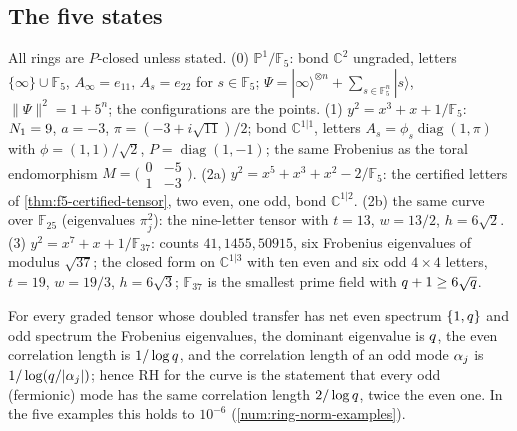 \subsection{The five states}

\begin{definition}
\label{def:example-states}
All rings are $P$-closed unless stated. (0) $\mathbb P^1/\mathbb F_5$: bond $\mathbb C^2$
ungraded, letters $\{\infty\}\cup\mathbb F_5$, $A_\infty = e_{11}$, $A_s = e_{22}$ for $s\in\mathbb F_5$;
$\Psi = |\infty\rangle^{\otimes n}+\sum_{s\in\mathbb F_5^n}|s\rangle$, $\|\Psi\|^2 = 1+5^n$; the
configurations are the points. (1) $y^2 = x^3+x+1/\mathbb F_5$: $N_{1} = 9$, $a = -3$,
$\pi = (-3+i\sqrt{11})/2$; bond $\mathbb C^{1|1}$, letters $A_s = \phi_s\operatorname{diag}(1,\pi)$ with
$\phi = (1,1)/\sqrt2$, $P = \operatorname{diag}(1,-1)$; the same Frobenius as the toral endomorphism
$M = \bigl(\begin{smallmatrix}0&-5\\1&-3\end{smallmatrix}\bigr)$. (2a) $y^2 = x^5+x^3+x^2-2/\mathbb F_5$:
the certified letters of \cref{thm:f5-certified-tensor}, two even, one odd, bond $\mathbb C^{1|2}$.
(2b) the same curve over $\mathbb F_{25}$ (eigenvalues $\pi_j^2$): the nine-letter tensor with
$t = 13$, $w = 13/2$, $h = 6\sqrt2$. (3) $y^2 = x^7+x+1/\mathbb F_{37}$: counts $41, 1455, 50915$,
six Frobenius eigenvalues of modulus $\sqrt{37}$; the closed form on $\mathbb C^{1|3}$ with ten
even and six odd $4\times4$ letters, $t = 19$, $w = 19/3$, $h = 6\sqrt3$; $\mathbb F_{37}$ is the
smallest prime field with $q+1\ge6\sqrt{q}$.
\end{definition}

\begin{proposition}
\label{prop:example-correlation-lengths}
For every graded tensor whose doubled transfer has net even spectrum $\{1,q\}$ and odd
spectrum the Frobenius eigenvalues, the dominant eigenvalue is $q$, the even correlation
length is $1/\log q$, and the correlation length of an odd mode $\alpha_{j}$ is
$1/\log(q/|\alpha_{j}|)$; hence RH for the curve is the statement that every odd (fermionic)
mode has the same correlation length $2/\log q$, twice the even one. In the five examples
this holds to $10^{-6}$ (\cref{num:ring-norm-examples}).
\end{proposition}

